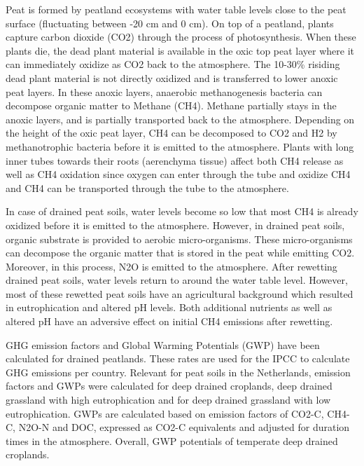 {%
Peat is formed by peatland ecosystems with water table levels close to the peat surface (fluctuating between -20 cm and 0 cm). On top of a peatland, plants capture carbon dioxide (CO2) through the process of photosynthesis. When these plants die, the dead plant material is available in the oxic top peat layer where it can immediately oxidize as CO2 back to the atmosphere. The 10-30\% risiding dead plant material is not directly oxidized and is transferred to lower anoxic peat layers. In these anoxic layers, anaerobic methanogenesis bacteria can decompose organic matter to Methane (CH4). Methane partially stays in the anoxic layers, and is partially transported back to the atmosphere. Depending on the height of the oxic peat layer, CH4 can be decomposed to CO2 and H2 by methanotrophic bacteria before it is emitted to the atmosphere. Plants with long inner tubes towards their roots (aerenchyma tissue) affect both CH4 release as well as CH4 oxidation since oxygen can enter through the tube and oxidize CH4 and CH4 can be transported through the tube to the atmosphere. 

In case of drained peat soils, water levels become so low that most CH4 is already oxidized before it is emitted to the atmosphere. However, in drained peat soils, organic substrate is provided to aerobic micro-organisms. These micro-organisms can decompose the organic matter that is stored in the peat while emitting CO2. Moreover, in this process, N2O is emitted to the atmosphere. After rewetting drained peat soils, water levels return to around the water table level. However, most of these rewetted peat soils have an agricultural background which resulted in eutrophication and altered pH levels. Both additional nutrients as well as altered pH have an adversive effect on initial CH4 emissions after rewetting. 

GHG emission factors and Global Warming Potentials (GWP) have been calculated for drained peatlands. These rates are used for the IPCC to calculate GHG emissions per country. Relevant for peat soils in the Netherlands, emission factors and GWPs were calculated for deep drained croplands, deep drained grassland with high eutrophication and for deep drained grassland with low eutrophication. GWPs are calculated based on emission factors of CO2-C, CH4-C, N2O-N and DOC, expressed as CO2-C equivalents and adjusted for duration times in the atmosphere. Overall, GWP potentials of temperate deep drained croplands.

}
